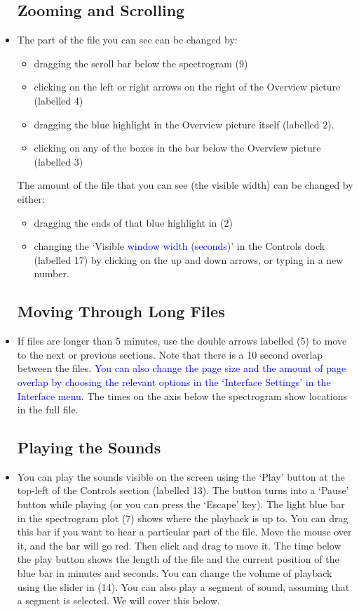 \documentclass{article}
\begin{document}
\begin{itemize}
\subsection{Zooming and Scrolling}

\item The part of the file you can see can be changed by:
	\begin{itemize}
	\item dragging the scroll bar below the spectrogram (9)
	\item clicking on the left or right arrows on the right of the Overview picture (labelled 4)
	\item dragging the blue highlight in the Overview picture itself (labelled 2). 
	\item clicking on any of the boxes in the bar below the Overview picture (labelled 3)
	\end{itemize}
	The amount of the file that you can see (the visible width) can be changed by either: 
	\begin{itemize}
	\item dragging the ends of that blue highlight in (2)
	\item changing the `Visible \textcolor{blue}{window width (seconds)}' in the Controls dock (labelled 17) by clicking on the up and down arrows, or typing in a new number.
	\end{itemize}

\subsection{Moving Through Long Files}

\item If files are longer than 5 minutes, use the double arrows labelled (5) to move to the next or previous sections. Note that there is a 10 second overlap between the files. \textcolor{blue}{You can also change the page size and the amount of page overlap by choosing the relevant options in the `Interface Settings' in the Interface menu.} The times on the axis below the spectrogram show locations in the full file.

\subsection{Playing the Sounds}

\item You can play the sounds visible on the screen using the `Play' button at the top-left of the Controls section (labelled 13). The button turns into a `Pause' button while playing (or you can press the `Escape' key). The light blue bar in the spectrogram plot (7)  shows where the playback is up to. You can drag this bar if you want to hear a particular part of the file. Move the mouse over it, and the bar will go red. Then click and drag to move it. The time below the play button shows the length of the file and the current position of the blue bar in minutes and seconds. You can change the volume of playback using the slider in (14). 
You can also play a segment of sound, assuming that a segment is selected. We will cover this below.


\end{itemize}
\end{document}
